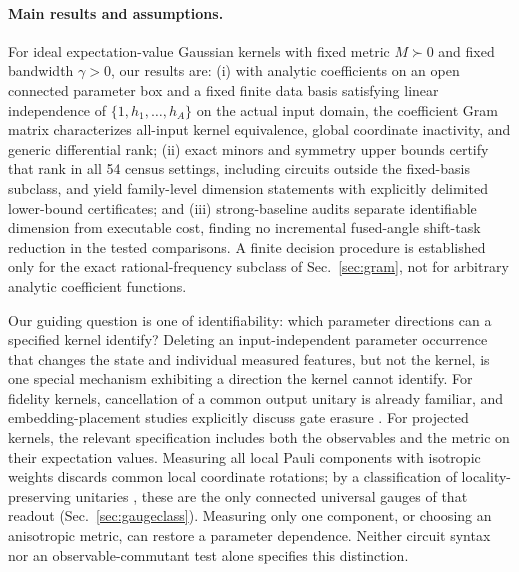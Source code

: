 \documentclass[a4paper,twocolumn,11pt,unpublished]{quantumarticle}
\begin{document}


\paragraph{Main results and assumptions.}
For ideal expectation-value Gaussian kernels with fixed metric
$M\succ0$ and fixed bandwidth $\gamma>0$, our results are:
(i) with analytic coefficients on an open connected parameter box
and a fixed finite data basis satisfying linear independence of
$\{1,h_1,\ldots,h_A\}$ on the actual input domain, the coefficient
Gram matrix characterizes all-input kernel equivalence, global
coordinate inactivity, and generic differential rank;
(ii) exact minors and symmetry upper bounds certify that rank in
all 54 census settings, including circuits outside the fixed-basis
subclass, and yield family-level dimension statements with explicitly
delimited lower-bound certificates; and
(iii) strong-baseline audits separate identifiable dimension from
executable cost, finding no incremental fused-angle shift-task
reduction in the tested comparisons. A finite decision procedure is
established only for the exact rational-frequency subclass of
Sec.~\ref{sec:gram}, not for arbitrary analytic coefficient functions.



Our guiding question is one of identifiability: which parameter
directions can a specified kernel identify? Deleting an
input-independent parameter occurrence that changes the state and
individual measured features, but not the kernel, is one special
mechanism exhibiting a direction the kernel cannot identify.
For fidelity kernels, cancellation of a common output unitary is
already familiar, and embedding-placement studies explicitly discuss
gate erasure \cite{salmenpera}. For projected kernels, the relevant
specification includes both the observables and the metric on their
expectation values. Measuring all local Pauli components with isotropic
weights discards common local coordinate rotations; by a classification
of locality-preserving unitaries \cite{cpr2019locality}, these are the
only connected universal gauges of that readout
(Sec.~\ref{sec:gaugeclass}). Measuring only
one component, or choosing an anisotropic metric, can restore a
parameter dependence. Neither circuit syntax nor an observable-commutant
test alone specifies this distinction.
\end{document}
